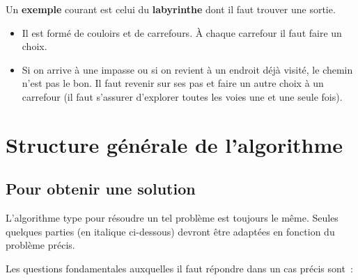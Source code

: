 	Un \textbf{exemple} courant est celui du \textbf{labyrinthe} 
	dont il faut trouver une sortie.

	\begin{itemize}
		\item {
			Il est formé de couloirs et de carrefours. 
			À chaque carrefour il faut faire un choix.}
		\item {
			Si on arrive à une impasse ou si on revient à un endroit déjà visité, 
			le chemin n'est pas le bon. Il faut revenir sur ses pas et 
			faire un autre choix à un carrefour (il faut s'assurer d'explorer 
			toutes les voies une et une seule fois).}
	\end{itemize}


\section{Structure générale de l'algorithme}

	\subsection{Pour obtenir une solution}
		
		L'algorithme type pour résoudre un tel problème est toujours 
		le même. Seules quelques parties (en italique ci-dessous)
		devront être adaptées en fonction du problème précis.
		

		Les questions fondamentales auxquelles 
		il faut répondre dans un cas précis sont~:

